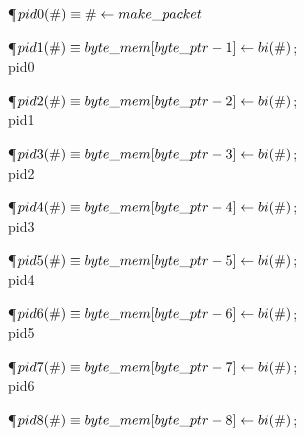 \Y\P\D {}$\\{pid0}(\#)\equiv\#\gets\\{make\_packet}$\par
\P\D {}$\\{pid1}(\#)\equiv\\{byte\_mem}[\\{byte\_ptr}-1]\gets\\{bi}(\#)$;\5
\\{pid0}\par
\P\D {}$\\{pid2}(\#)\equiv\\{byte\_mem}[\\{byte\_ptr}-2]\gets\\{bi}(\#)$;\5
\\{pid1}\par
\P\D {}$\\{pid3}(\#)\equiv\\{byte\_mem}[\\{byte\_ptr}-3]\gets\\{bi}(\#)$;\5
\\{pid2}\par
\P\D {}$\\{pid4}(\#)\equiv\\{byte\_mem}[\\{byte\_ptr}-4]\gets\\{bi}(\#)$;\5
\\{pid3}\par
\P\D {}$\\{pid5}(\#)\equiv\\{byte\_mem}[\\{byte\_ptr}-5]\gets\\{bi}(\#)$;\5
\\{pid4}\par
\P\D {}$\\{pid6}(\#)\equiv\\{byte\_mem}[\\{byte\_ptr}-6]\gets\\{bi}(\#)$;\5
\\{pid5}\par
\P\D {}$\\{pid7}(\#)\equiv\\{byte\_mem}[\\{byte\_ptr}-7]\gets\\{bi}(\#)$;\5
\\{pid6}\par
\P\D {}$\\{pid8}(\#)\equiv\\{byte\_mem}[\\{byte\_ptr}-8]\gets\\{bi}(\#)$;\5
